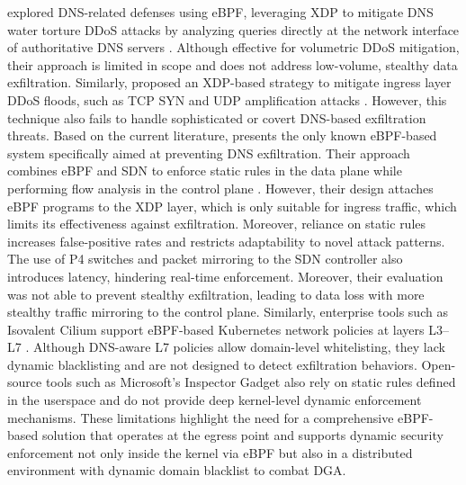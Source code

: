 \documentclass [11pt, proquest] {uwthesis}[2020/02/24]
\begin{document}
\citeauthor{9165454} explored DNS-related defenses using eBPF, leveraging XDP to mitigate DNS water torture DDoS attacks by analyzing queries directly at the network interface of authoritative DNS servers \cite{9165454}. Although effective for volumetric DDoS mitigation, their approach is limited in scope and does not address low-volume, stealthy data exfiltration. Similarly, \citeauthor{bertin2017xdp} proposed an XDP-based strategy to mitigate ingress layer DDoS floods, such as TCP SYN and UDP amplification attacks \cite{bertin2017xdp}. However, this technique also fails to handle sophisticated or covert DNS-based exfiltration threats.
Based on the current literature, \citeauthor{steadman2021dnsxp} presents the only known eBPF-based system specifically aimed at preventing DNS exfiltration. Their approach combines eBPF and SDN to enforce static rules in the data plane while performing flow analysis in the control plane \cite{steadman2021dnsxp, 8725640}. However, their design attaches eBPF programs to the XDP layer, which is only suitable for ingress traffic, which limits its effectiveness against exfiltration. Moreover, reliance on static rules increases false-positive rates and restricts adaptability to novel attack patterns. The use of P4 switches and packet mirroring to the SDN controller also introduces latency, hindering real-time enforcement. Moreover, their evaluation was not able to prevent stealthy exfiltration, leading to data loss with more stealthy traffic mirroring to the control plane. Similarly, enterprise tools such as Isovalent Cilium support eBPF-based Kubernetes network policies at layers L3–L7 \cite{zavarella2022methodology, 10.1145/3651890.3672227}. Although DNS-aware L7 policies allow domain-level whitelisting, they lack dynamic blacklisting and are not designed to detect exfiltration behaviors. Open-source tools such as Microsoft's Inspector Gadget also rely on static rules defined in the userspace and do not provide deep kernel-level dynamic enforcement mechanisms. These limitations highlight the need for a comprehensive eBPF-based solution that operates at the egress point and supports dynamic security enforcement not only inside the kernel via eBPF but also in a distributed environment with dynamic domain blacklist to combat DGA. 
\end{document}
